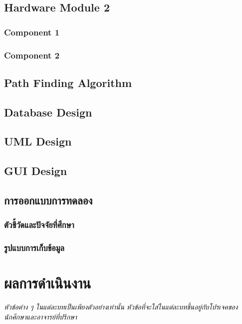 \documentclass[12pt,oneside,openright,a4paper]{cpe-thai-project}
\begin{document}
\section{Hardware Module 2}
\subsection{Component 1}
\subsection{Component 2}

\section{Path Finding Algorithm}

\section{Database Design}

\section{UML Design}

\section{GUI Design}

\section{การออกแบบการทดลอง}
\subsection{ตัวชี้วัดและปัจจัยที่ศึกษา}
\subsection{รูปแบบการเก็บข้อมูล}




\chapter{ผลการดำเนินงาน}


\emph{หัวข้อต่าง ๆ ในแต่ละบทเป็นเพียงตัวอย่างเท่านั้น หัวข้อที่จะใส่ในแต่ละบทขึ้นอยู่กับโปรเจคของนักศึกษาและอาจารย์ที่ปรึกษา}
\end{document}
